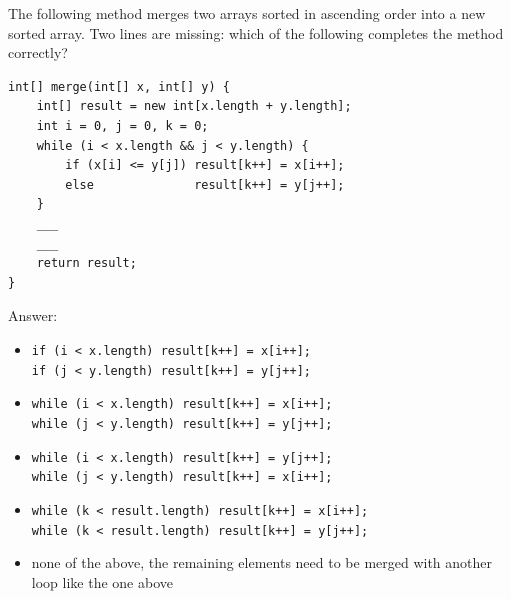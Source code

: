 \begin{question}
The following method merges two arrays sorted in ascending order into a new sorted array.
Two lines are missing: which of the following completes the method correctly?

\begin{lstlisting}
int[] merge(int[] x, int[] y) {
    int[] result = new int[x.length + y.length];
    int i = 0, j = 0, k = 0;
    while (i < x.length && j < y.length) {
        if (x[i] <= y[j]) result[k++] = x[i++];
        else              result[k++] = y[j++];
    }
    ___
    ___
    return result;
}
\end{lstlisting}

Answer:
\begin{itemize}[leftmargin=2em,itemsep=3pt,topsep=2pt]
\item[\cb{0}] \lstinline[keepspaces=true]|if (i < x.length) result[k++] = x[i++];|\\
              \lstinline[keepspaces=true]|if (j < y.length) result[k++] = y[j++];|
\item[\cb{1}] \lstinline[keepspaces=true]|while (i < x.length) result[k++] = x[i++];|\\
              \lstinline[keepspaces=true]|while (j < y.length) result[k++] = y[j++];|
\item[\cb{0}] \lstinline[keepspaces=true]|while (i < x.length) result[k++] = y[j++];|\\
              \lstinline[keepspaces=true]|while (j < y.length) result[k++] = x[i++];|
\item[\cb{0}] \lstinline[keepspaces=true]|while (k < result.length) result[k++] = x[i++];|\\
              \lstinline[keepspaces=true]|while (k < result.length) result[k++] = y[j++];|
\item[\cb{0}] none of the above, the remaining elements need to be merged with another loop like the one above
\end{itemize}
\end{question}

